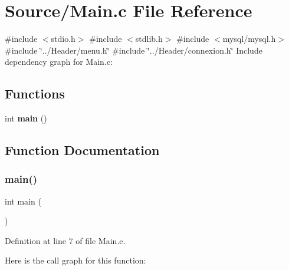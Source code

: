 \section{Source/\+Main.c File Reference}
\label{_main_8c}
{\ttfamily \#include $<$stdio.\+h$>$}\newline
{\ttfamily \#include $<$stdlib.\+h$>$}\newline
{\ttfamily \#include $<$mysql/mysql.\+h$>$}\newline
{\ttfamily \#include \char`\"{}../\+Header/menu.\+h\char`\"{}}\newline
{\ttfamily \#include \char`\"{}../\+Header/connexion.\+h\char`\"{}}\newline
Include dependency graph for Main.\+c\+:
\subsection*{Functions}
\begin{DoxyCompactItemize}
\item 
int \textbf{ main} ()
\end{DoxyCompactItemize}


\subsection{Function Documentation}
\mbox{\label{_main_8c_ae66f6b31b5ad750f1fe042a706a4e3d4}} 
\subsubsection{main()}
{\footnotesize\ttfamily int main (\begin{DoxyParamCaption}{ }\end{DoxyParamCaption})}



Definition at line 7 of file Main.\+c.

Here is the call graph for this function\+:
